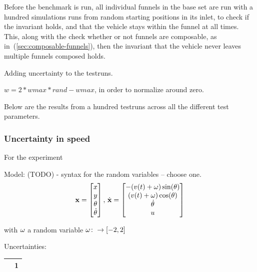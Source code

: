 Before the benchmark is run, all individual funnels in the base set are run with
a hundred simulations runs from random starting positions in its inlet, to check
if the invariant holds, and that the vehicle stays within the funnel at all
times. This, along with the check whether or not funnels are composable, as
in~(\ref{sec:composable-funnels}), then the invariant that the vehicle never leaves
multiple funnels composed holds.

Adding uncertainty to the testruns.

\(w = 2*wmax*rand - wmax\), in order to normalize around zero.

Below are the results from a hundred testruns across all the different test
parameters.

\subsubsection{Uncertainty in speed}

For the experiment

Model: (TODO) - syntax for the random variables -- choose one.
\begin{equation}
  \label{eq:model-dynamics}
  \mathbf{x} =
  \begin{bmatrix}
    x \\ y \\ \theta \\ \dot{\theta} \\
  \end{bmatrix}, \, \dot{\mathbf{x}} =
  \begin{bmatrix}
    -(v(t) + \mathbf{\omega}{}) \sin(\theta) \\
    (v(t) + \mathbf{\omega}{}) \cos(\theta) \\
    \dot{\theta} \\
    u \\
  \end{bmatrix}
\end{equation}

with \(\mathbf{\omega}{}\) a random variable \(\mathbf{\omega}{} \colon
\rightarrow [-2,2]\)

Uncertainties:
\begin{tabular}{ |c|c| }
  \hline
  \randomSpeedVar{} & 1 \\
  \hline
\end{tabular}

